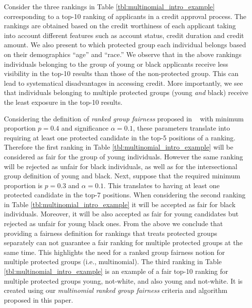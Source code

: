 \begin{example} Consider the three rankings in Table \ref{tbl:multinomial_intro_example} corresponding to a top-10 ranking of applicants in a credit approval process. The rankings are obtained based on the credit worthiness of each applicant taking into account different features such as account status, credit duration and credit amount. 
	We also present to which protected group each individual belongs based on their demographics ``age'' and ``race.'' We observe that in the above rankings individuals belonging to the group of young or black applicants receive less visibility in the top-10 results than those of the non-protected group. This can lead to systematical disadvantages in accessing credit. More importantly, we see that individuals belonging to multiple protected groups (young \emph{and } black) receive the least exposure in the top-10 results.
	
	Considering the definition of \textit{ranked group fairness} proposed in ~\cite{zehlike2017fair} with minimum proportion $p=0.4$ and significance $\alpha=0.1$, these parameters translate into requiring at least one protected candidate in the top-5 positions of a ranking.
	Therefore the first ranking in Table \ref{tbl:multinomial_intro_example} will be considered as fair for the group of young individuals. 
	However the same ranking will be rejected as unfair for black individuals, as well as for the intersectional group definition of young and black.
	Next, suppose that the required minimum proportion is $p = 0.3$ and $\alpha = 0.1$. This translates to having at least one protected candidate in the top-7 positions.
	When considering the second ranking in Table \ref{tbl:multinomial_intro_example} it will be accepted as fair for black individuals. Moreover, it will be also accepted as fair for young candidates but rejected as unfair for young black ones.
	From the above we conclude that providing a fairness definition for rankings that treats protected groups separately can not guarantee a fair ranking for multiple protected groups at the same time. This highlights the need for a ranked group fairness notion for multiple protected groups (i.e., multinomial). 
	The third ranking in Table \ref{tbl:multinomial_intro_example} is an example of a fair top-10 ranking for multiple protected groups young, not-white, and also young and not-white. It is created using our \textit{multinomial ranked group fairness} criteria and algorithm proposed in this paper. 
	
\end{example}

